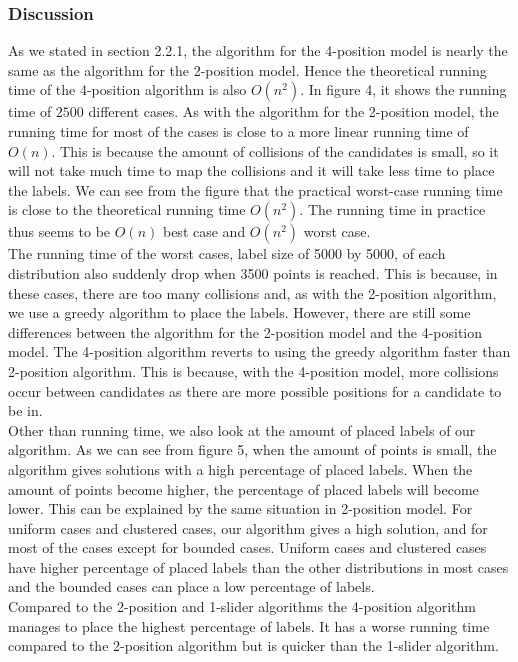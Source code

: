 \documentclass[crop=false,a4paper,oneside,11pt]{standalone}
\begin{document}
\subsubsection{Discussion}
As we stated in section 2.2.1, the algorithm for the 4-position model is nearly the same as the algorithm for the 2-position model. Hence the theoretical running time of the 4-position algorithm is also $O(n^2)$. In figure 4, it shows the running time of $2500$ different cases. As with the algorithm for the 2-position model, the running time for most of the cases is close to a more linear running time of $O(n)$. This is because the amount of collisions of the candidates is small, so it will not take much time to map the collisions and it will take less time to place the labels. We can see from the figure that the practical worst-case running time is close to the theoretical running time $O(n^2)$. The running time in practice thus seems to be $O(n)$ best case and $O(n^2)$ worst case.\\
The running time of the worst cases, label size of 5000 by 5000, of each distribution also suddenly drop when 3500 points is reached. This is because, in these cases, there are too many collisions and, as with the 2-position algorithm, we use a greedy algorithm to place the labels. However, there are still some differences between the algorithm for the 2-position model and the 4-position model. The 4-position algorithm reverts to using the greedy algorithm faster than 2-position algorithm. This is because, with the 4-position model, more collisions occur between candidates as there are more possible positions for a candidate to be in.\\
Other than running time, we also look at the amount of placed labels of our algorithm. As we can see from figure 5, when the amount of points is small, the algorithm gives solutions with a high percentage of placed labels. When the amount of points become higher, the percentage of placed labels will become lower. This can be explained by the same situation in 2-position model. For uniform cases and clustered cases, our algorithm gives a high solution, and for most of the cases except for bounded cases. Uniform cases and clustered cases have higher percentage of placed labels than the other distributions in most cases and the bounded cases can place a low percentage of labels.\\
Compared to the 2-position and 1-slider algorithms the 4-position algorithm manages to place the highest percentage of labels. It has a worse running time compared to the 2-position algorithm but is quicker than the 1-slider algorithm.\\
\end{document}

